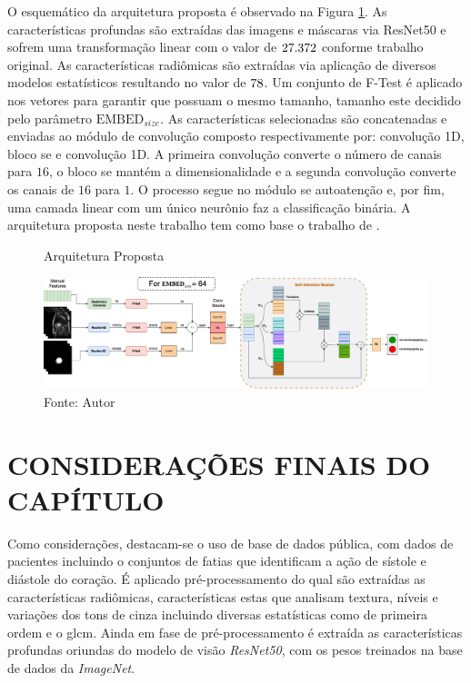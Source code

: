 O esquemático da arquitetura proposta é observado na Figura \ref{fig:fig011}. As características profundas são extraídas das imagens e máscaras via ResNet50 e sofrem uma transformação linear com o valor de $27.372$ conforme trabalho original. As características radiômicas são extraídas via aplicação de diversos modelos estatísticos resultando no valor de $78$. Um conjunto de F-Test é aplicado nos vetores para garantir que possuam o mesmo tamanho, tamanho este decidido pelo parâmetro $\text{EMBED}_{size}$. As características selecionadas são concatenadas e enviadas ao módulo de convolução composto respectivamente por: convolução 1D, bloco \gls{se} e convolução 1D. A primeira convolução converte o número de canais para $16$, o bloco \gls{se} mantém a dimensionalidade e a segunda convolução converte os canais de $16$ para $1$. O processo segue no módulo se autoatenção e, por fim, uma camada linear com um único neurônio faz a classificação binária. A arquitetura proposta neste trabalho tem como base o trabalho de \cite{aiSelfAttentionBasedFusion2023}.
\newline

\begin{figure}[H]
    \centering
    \caption{Arquitetura Proposta}
    \includegraphics[width=1.02\textwidth]{figures/fig011.png}
    \caption*{Fonte: Autor}
    \label{fig:fig011}
\end{figure}

\section{CONSIDERAÇÕES FINAIS DO CAPÍTULO}
\label{sec:cap4_consideracoes_finais}

Como considerações, destacam-se o uso de base de dados pública, com dados de pacientes incluindo o conjuntos de fatias que identificam a ação de sístole e diástole do coração. É aplicado pré-processamento do qual são extraídas as características radiômicas, características estas que analisam textura, níveis e variações dos tons de cinza incluindo diversas estatísticas como de primeira ordem e o \gls{glcm}. Ainda em fase de pré-processamento é extraída as características profundas oriundas do modelo de visão \textit{ResNet50}, com os pesos treinados na base de dados da \textit{ImageNet}. 


